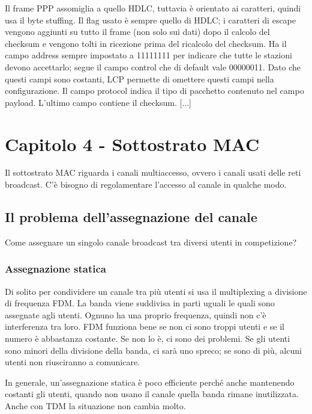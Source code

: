 Il frame PPP assomiglia a quello HDLC, tuttavia è orientato ai caratteri, quindi usa il byte stuffing.
Il flag usato è sempre quello di HDLC; i caratteri di escape vengono aggiunti su tutto il frame (non solo sui dati)
dopo il calcolo del checksum e vengono tolti in ricezione prima del ricalcolo del checksum.
Ha il campo address sempre impostato a 11111111 per indicare che tutte le stazioni devono accettarlo;
segue il campo control che di default vale 00000011.
Dato che questi campi sono costanti, LCP permette di omettere questi campi nella configurazione.
Il campo protocol indica il tipo di pacchetto contenuto nel campo payload.
L'ultimo campo contiene il checksum.
[...]

\newpage
\section{Capitolo 4 - Sottostrato MAC}
Il sottostrato MAC riguarda i canali multiaccesso, ovvero i canali usati delle reti broadcast.
C'è bisogno di regolamentare l'accesso al canale in qualche modo.

\subsection{Il problema dell'assegnazione del canale} %
Come assegnare un singolo canale broadcast tra diversi utenti in competizione?

\subsubsection{Assegnazione statica}
Di solito per condividere un canale tra più utenti si usa il multiplexing a divisione di frequenza FDM.
La banda viene suddivisa in parti uguali le quali sono assegnate agli utenti. 
Ognuno ha una proprio frequenza, quindi non c'è interferenza tra loro.
FDM funziona bene se non ci sono troppi utenti e se il numero è abbastanza costante.
Se non lo è, ci sono dei problemi. 
Se gli utenti sono minori della divisione della banda, ci sarà uno spreco;
se sono di più, alcuni utenti non riusciranno a comunicare.

In generale, un'assegnazione statica è poco efficiente perché anche mantenendo costanti gli utenti,
quando non usano il canale quella banda rimane inutilizzata.
Anche con TDM la situazione non cambia molto.

